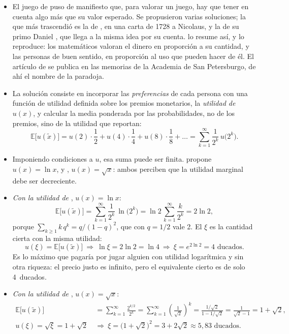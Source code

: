 \documentclass[11pt]{article}
\begin{document}
\begin{itemize}
\item El juego de  puso de manifiesto que, para valorar un juego, hay que tener en cuenta algo más que su valor esperado. Se propusieron varias soluciones; la que más trascendió es la de , en una carta de 1728 a Nicolaus, y la de su primo Daniel \textcite{Bernoulli1738Specimen}, que llega a la misma idea por su cuenta.  lo resume así, y  lo reproduce: los matemáticos valoran el dinero en proporción a su cantidad, y las personas de buen sentido, en proporción al uso que pueden hacer de él\nocite{Peterson2023StPetersburg}. El artículo de  se publica en las memorias de la Academia de San Petersburgo, de ahí el nombre de la paradoja.
\item La solución consiste en incorporar las \emph{preferencias} de cada persona con una función de utilidad definida sobre los premios monetarios, la \emph{utilidad de } $u(x)$, y calcular la media ponderada por las probabilidades, no de los premios, sino de la utilidad que reportan:
  $$\mathbb{E}\big[u(\tilde{x})\big]=u(2)\cdot\frac12+u(4)\cdot\frac14+u(8)\cdot\frac18+\dots=\sum_{k=1}^{\infty}\frac{1}{2^k}\,u\big(2^k\big).$$
\item Imponiendo condiciones a $u$, esa suma puede ser finita.  propone $u(x)=\ln x$, y , $u(x)=\sqrt{x}$: ambos perciben que la utilidad marginal debe ser decreciente.
\item \emph{Con la utilidad de }, $u(x)=\ln x$:
  $$\mathbb{E}\big[u(\tilde{x})\big]=\sum_{k=1}^{\infty}\frac{1}{2^k}\,\ln\big(2^k\big)=\ln 2\,\sum_{k=1}^{\infty}\frac{k}{2^k}=2\ln 2 ,$$
  porque $\sum_{k\geq 1}k\,q^k=q/(1-q)^2$, que con $q=1/2$ vale 2. El  $\xi$ es la cantidad cierta con la misma utilidad:
  $$u(\xi)=\mathbb{E}\big[u(\tilde{x})\big]\ \Longrightarrow\ \ln\xi=2\ln 2=\ln 4\ \Longrightarrow\ \xi=e^{2\ln 2}=4 \text{ ducados}.$$
  Es lo máximo que pagaría por jugar alguien con utilidad logarítmica y sin otra riqueza: el precio justo es infinito, pero el equivalente cierto es de solo 4~ducados.
\item \emph{Con la utilidad de }, $u(x)=\sqrt{x}$:
  $$\begin{aligned}
  \mathbb{E}\big[u(\tilde{x})\big]&=\sum_{k=1}^{\infty}\frac{2^{k/2}}{2^k}=\sum_{k=1}^{\infty}\left(\frac{1}{\sqrt2}\right)^{k}=\frac{1/\sqrt2}{1-1/\sqrt2}=\frac{1}{\sqrt2-1}=1+\sqrt2 ,\\
  u(\xi)=\sqrt{\xi}=1+\sqrt2\ &\Longrightarrow\ \xi=\big(1+\sqrt2\big)^2=3+2\sqrt2\approx 5{,}83 \text{ ducados}.
  \end{aligned}$$
\end{itemize}
\findemo
\end{document}
